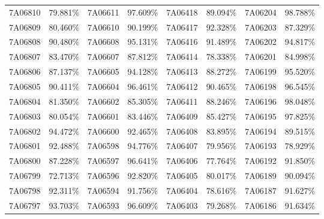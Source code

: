 \documentclass[12pt]{article}%
\begin{document}
\begin{longtable}{|cc|cc|cc|cc|}
7A06810              & 79.881\% & 7A06611              & 97.609\% & 7A06418              & 89.094\% & \multicolumn{1}{l}{7A06204             } & 98.788\% \\
7A06809              & 80.460\% & 7A06610              & 90.199\% & 7A06417              & 92.328\% & \multicolumn{1}{l}{7A06203             } & 87.329\% \\
7A06808              & 90.480\% & 7A06608              & 95.131\% & 7A06416              & 91.489\% & \multicolumn{1}{l}{7A06202             } & 94.817\% \\
7A06807              & 83.470\% & 7A06607              & 87.812\% & 7A06414              & 78.338\% & \multicolumn{1}{l}{7A06201             } & 84.998\% \\
7A06806              & 87.137\% & 7A06605              & 94.128\% & 7A06413              & 88.272\% & \multicolumn{1}{l}{7A06199             } & 95.520\% \\
7A06805              & 90.411\% & 7A06604              & 96.461\% & 7A06412              & 90.465\% & \multicolumn{1}{l}{7A06198             } & 96.545\% \\
7A06804              & 81.350\% & 7A06602              & 85.305\% & 7A06411              & 88.246\% & \multicolumn{1}{l}{7A06196             } & 98.048\% \\
7A06803              & 80.054\% & 7A06601              & 83.446\% & 7A06409              & 85.427\% & \multicolumn{1}{l}{7A06195             } & 97.825\% \\
7A06802              & 94.472\% & 7A06600              & 92.465\% & 7A06408              & 83.895\% & \multicolumn{1}{l}{7A06194             } & 89.515\% \\
7A06801              & 92.488\% & 7A06598              & 94.776\% & 7A06407              & 79.956\% & \multicolumn{1}{l}{7A06193             } & 78.929\% \\
7A06800              & 87.228\% & 7A06597              & 96.641\% & 7A06406              & 77.764\% & \multicolumn{1}{l}{7A06192             } & 91.850\% \\
7A06799              & 72.713\% & 7A06596              & 92.820\% & 7A06405              & 80.017\% & \multicolumn{1}{l}{7A06189             } & 90.094\% \\
7A06798              & 92.311\% & 7A06594              & 91.756\% & 7A06404              & 78.616\% & \multicolumn{1}{l}{7A06187             } & 91.627\% \\
7A06797              & 93.703\% & 7A06593              & 96.609\% & 7A06403              & 79.268\% & \multicolumn{1}{l}{7A06186             } & 91.634\% \\

\end{longtable}
\end{document}
